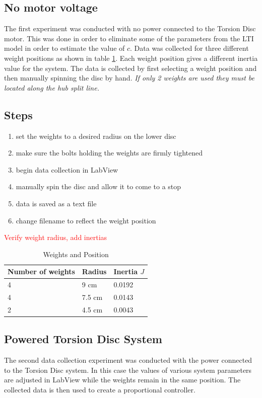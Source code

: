 \documentclass[11pt,titlepage]{article}
\begin{document}
	\subsection{No motor voltage}
		The first experiment was conducted with no power connected to the Torsion Disc motor. This was done in order to eliminate some of the parameters from the LTI model in order to estimate the value of $c$. Data was collected for three different weight positions as shown in table \ref{table:weight_pos}. Each weight position gives a different inertia value for the system. The data is collected by first selecting a weight position and then manually spinning the disc by hand. \emph{If only 2 weights are used they must be located along the hub split line.}
	\subsection*{Steps}
		\begin{enumerate}
			\item set the weights to a desired radius on the lower disc
			\item make sure the bolts holding the weights are firmly tightened
			\item begin data collection in LabView
			\item manually spin the disc and allow it to come to a stop
			\item data is saved as a text file
			\item change filename to reflect the weight position
		\end{enumerate}
			\textcolor{red}{Verify weight radius, add inertias}
		\begin{table}[h!]
			\centering
			\begin{tabular}{|m{4cm}|m{3cm}|m{3cm}|} 
				\hline
				Number of weights & Radius & Inertia $J$ \\ 
				\hline
				4 & 9 cm & 0.0192 \\
				\hline
				4 & 7.5 cm & 0.0143\\
				\hline
				2 & 4.5 cm & 0.0043 \\
				\hline
			\end{tabular}
			\caption{Weights and Position} \label{table:weight_pos}
		\end{table}
	\subsection{Powered Torsion Disc System}
	The second data collection experiment was conducted with the power connected to the Torsion Disc system. In this case the values of various system parameters are adjusted in LabView while the weights remain in the same position. The collected data is then used to create a proportional controller.
\end{document}
